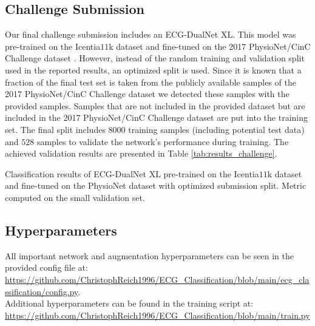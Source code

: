 \subsection{Challenge Submission} \label{subsec:challenge}

Our final challenge submission includes an ECG-DualNet XL. This model was pre-trained on the Icentia$11$k dataset \cite{Tan2019} and fine-tuned on the 2017 PhysioNet/CinC Challenge dataset \cite{Clifford2017}. However, instead of the random training and validation split used in the reported results, an optimized split is used. Since it is known that a fraction of the final test set is taken from the publicly available samples of the 2017 PhysioNet/CinC Challenge dataset we detected these samples with the provided samples. Samples that are not included in the provided dataset but are included in the 2017 PhysioNet/CinC Challenge dataset are put into the training set. The final split includes $8000$ training samples (including potential test data) and $528$ samples to validate the network's performance during training. The achieved validation results are presented in Table \ref{tab:results_challenge}.

\begin{table}[!ht]
    \centering
    \caption{Classification results of ECG-DualNet XL pre-trained on the Icentia$11$k dataset and fine-tuned on the PhysioNet dataset with optimized submission split. Metric computed on the small validation set.}
    
    \label{tab:results_challenge}
\end{table}

\subsection{Hyperparameters}\label{subsec:hyperparameters}

All important network and augmentation hyperparameters can be seen in the provided config file at: \url{https://github.com/ChristophReich1996/ECG_Classification/blob/main/ecg_classification/config.py}.\\
Additional hyperparameters can be found in the training script at: \url{https://github.com/ChristophReich1996/ECG_Classification/blob/main/train.py}